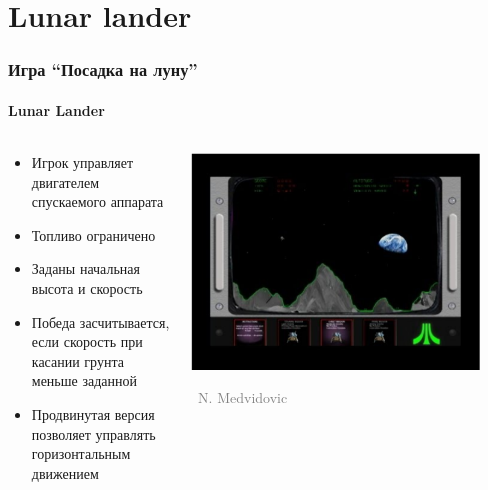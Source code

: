 \documentclass[xetex,mathserif,serif]{beamer}
\newcommand{\attribution}[1] {
	\vspace{-5mm}\begin{flushright}\begin{scriptsize}\textcolor{gray}{\textcopyright\, #1}\end{scriptsize}\end{flushright}
}
\begin{document}
	\section{Lunar lander}

	\begin{frame}
		\frametitle{Игра ``Посадка на луну''}
		\framesubtitle{Lunar Lander}
		\begin{columns}
			\begin{column}{0.5\textwidth}
				\begin{itemize}
					\item Игрок управляет двигателем спускаемого аппарата
					\item Топливо ограничено
					\item Заданы начальная высота и скорость
					\item Победа засчитывается, если скорость при касании грунта меньше заданной
					\item Продвинутая версия позволяет управлять горизонтальным движением
				\end{itemize}
			\end{column}
			\begin{column}{0.5\textwidth}
				\begin{center}
					\includegraphics[width=0.9\textwidth]{lunarLander.png}
					\attribution{N. Medvidovic}
				\end{center}
			\end{column}
		\end{columns}
	\end{frame}
\end{document}
